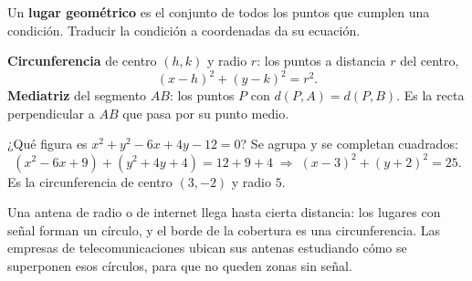 \documentclass[11pt]{article}
\begin{document}
Un \textbf{lugar geométrico} es el conjunto de todos los puntos que cumplen una
condición. Traducir la condición a coordenadas da su ecuación.

\begin{definicion}
\textbf{Circunferencia} de centro $(h, k)$ y radio $r$: los puntos a distancia $r$
del centro,
\[ (x - h)^2 + (y - k)^2 = r^2. \]
\textbf{Mediatriz} del segmento $AB$: los puntos $P$ con $d(P, A) = d(P, B)$. Es la
recta perpendicular a $AB$ que pasa por su punto medio.
\end{definicion}

\begin{ejemplo}
¿Qué figura es $x^2 + y^2 - 6x + 4y - 12 = 0$? Se agrupa y se completan cuadrados:
\[
  (x^2 - 6x + 9) + (y^2 + 4y + 4) = 12 + 9 + 4
  \;\Longrightarrow\; (x - 3)^2 + (y + 2)^2 = 25.
\]
Es la circunferencia de centro $(3, -2)$ y radio $5$.
\end{ejemplo}

\begin{aplicacion}
Una antena de radio o de internet llega hasta cierta distancia: los lugares con
señal forman un círculo, y el borde de la cobertura es una circunferencia. Las
empresas de telecomunicaciones ubican sus antenas estudiando cómo se superponen esos
círculos, para que no queden zonas sin señal.
\end{aplicacion}
\end{document}
